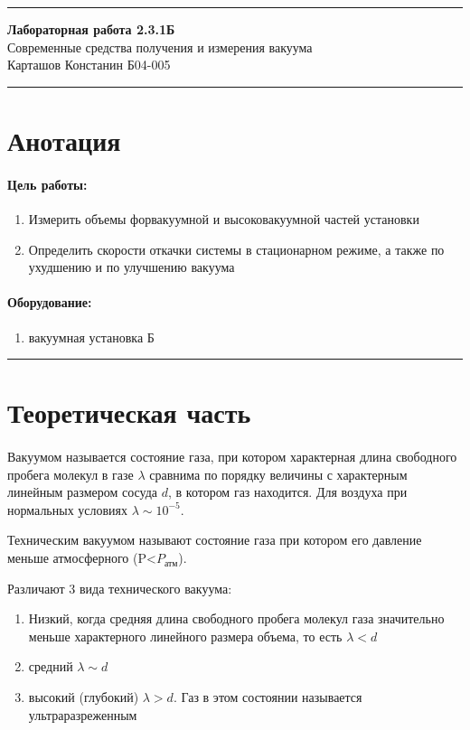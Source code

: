 \documentclass[a4paper,12pt]{article} %
\begin{document}
\hrule 	
\medskip
\begin{raggedright}
{\large \textbf{Лабораторная работа 2.3.1Б}}
\\
\medskip
{\Large Современные средства получения и измерения вакуума} 
\\
\medskip
{\large Карташов Констанин Б04-005}
\medskip
\hrule
\medskip
\end{raggedright}


\section{Анотация}

\paragraph{Цель работы:} 
\begin{enumerate}
\itemsep0em
\item Измерить объемы форвакуумной и высоковакуумной частей установки
\item Определить скорости откачки системы в стационарном режиме, а также по ухудшению и по улучшению вакуума
\end{enumerate}
\paragraph{Оборудование:}
\begin{enumerate}
\itemsep0em
\item вакуумная установка Б
\end{enumerate}

\medskip\hrule\medskip

\section{Теоретическая часть}

\paragraph{}
Вакуумом называется состояние газа, при котором характерная длина свободного пробега молекул в газе $\lambda$ сравнима по порядку величины с характерным линейным размером сосуда $d$, в котором газ находится. Для воздуха при нормальных условиях $\lambda \sim 10^{-5}$.

Техническим вакуумом называют состояние газа при котором его давление меньше атмосферного (P<$P_{\text{атм}}$).

Различают 3 вида технического вакуума:
\begin{enumerate}
\itemsep0em
\item Низкий, когда средняя длина свободного пробега молекул газа значительно меньше характерного линейного размера объема, то есть $\lambda < d$
\item средний $\lambda \sim d$
\item высокий (глубокий) $\lambda > d$. Газ в этом состоянии называется ультраразреженным 
\end{enumerate}
\end{document}
